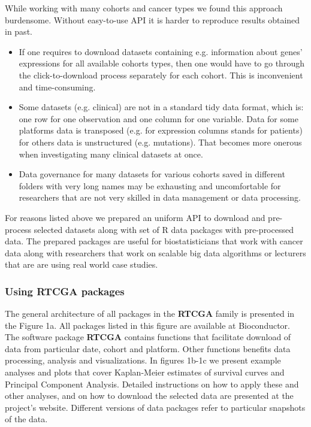 \documentclass{bioinfo}
\begin{document}
While working with many cohorts and cancer types we found this approach burdensome. Without easy-to-use API it is harder to reproduce results obtained in past.
\begin{itemize}
\item If one requires to download datasets containing e.g. information about genes' expressions for all available cohorts types, then one would have to go through the click-to-download process separately for each cohort. This is inconvenient and time-consuming.
\item Some datasets (e.g. clinical) are not in a standard tidy data format, which is: one row for one observation and one column for one variable. Data for some platforms data is transposed (e.g. for expression columns stands for patients) for others data is unstructured (e.g. mutations). That becomes more onerous when investigating many clinical datasets at once.
\item Data governance for many datasets for various cohorts saved in different folders with very long names may be exhausting and uncomfortable for researchers that are not very skilled in data management or data processing.
\end{itemize}
For reasons listed above we prepared an uniform API to download and pre-process selected datasets along with set of R data packages with pre-processed data. 
The prepared packages are useful for biostatisticians that work with cancer data along with researchers that work on scalable big data algorithms or lecturers that are are using real world case studies.

\subsubsection*{Using RTCGA packages}
The general architecture of all packages in the \textbf{RTCGA} family is presented in the Figure 1a. All packages listed in this figure are available at Bioconductor.
The software package \textbf{RTCGA} contains functions that facilitate download of data from particular date, cohort and platform. Other functions benefits data processing, analysis and visualizations. In figures 1b-1c we present example analyses and plots that cover Kaplan-Meier estimates of survival curves and Principal Component Analysis. Detailed instructions on how to apply these and other analyses, and on how to download the selected data are presented at the project's website. Different versions of data packages refer to particular snapshots of the data. 
\end{document}
